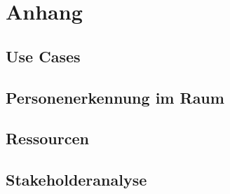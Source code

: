 
\section{Anhang}


\subsection{Use Cases}
\label{anhang:Use_Cases}

\clearpage

\clearpage


\subsection{Personenerkennung im Raum}
\label{anhang:Personenerkennung_im_Raum}

\clearpage

\subsection{Ressourcen}
\label{anhang:Ressourcen}
\clearpage

\subsection{Stakeholderanalyse}
\label{anhang:Stakeholderanalyse}
\clearpage